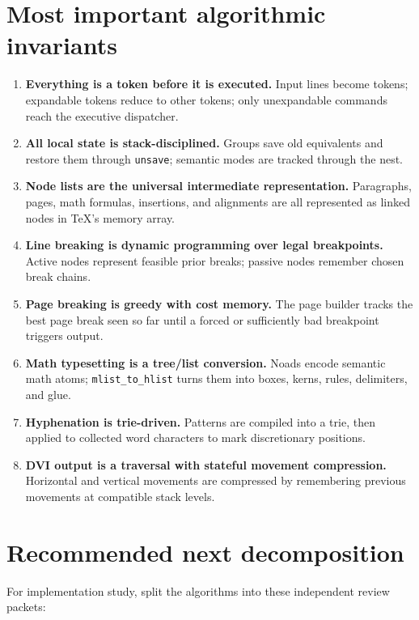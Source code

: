 \documentclass[11pt]{article}
\providecommand{\tightlist}{\setlength{\itemsep}{0pt}\setlength{\parskip}{0pt}}
\begin{document}
\section{Most important algorithmic
invariants}\label{most-important-algorithmic-invariants}

\begin{enumerate}
\def\labelenumi{\arabic{enumi}.}
\tightlist
\item
  \textbf{Everything is a token before it is executed.} Input lines
  become tokens; expandable tokens reduce to other tokens; only
  unexpandable commands reach the executive dispatcher.
\item
  \textbf{All local state is stack-disciplined.} Groups save old
  equivalents and restore them through \texttt{unsave};
  semantic modes are tracked through the nest.
\item
  \textbf{Node lists are the universal intermediate representation.}
  Paragraphs, pages, math formulas, insertions, and alignments are all
  represented as linked nodes in TeX's memory array.
\item
  \textbf{Line breaking is dynamic programming over legal breakpoints.}
  Active nodes represent feasible prior breaks; passive nodes remember
  chosen break chains.
\item
  \textbf{Page breaking is greedy with cost memory.} The page builder
  tracks the best page break seen so far until a forced or sufficiently
  bad breakpoint triggers output.
\item
  \textbf{Math typesetting is a tree/list conversion.} Noads encode
  semantic math atoms; \texttt{mlist\_to\_hlist} turns
  them into boxes, kerns, rules, delimiters, and glue.
\item
  \textbf{Hyphenation is trie-driven.} Patterns are compiled into a
  trie, then applied to collected word characters to mark discretionary
  positions.
\item
  \textbf{DVI output is a traversal with stateful movement compression.}
  Horizontal and vertical movements are compressed by remembering
  previous movements at compatible stack levels.
\end{enumerate}

\section{Recommended next
decomposition}\label{recommended-next-decomposition}

For implementation study, split the algorithms into these independent
review packets:
\end{document}

